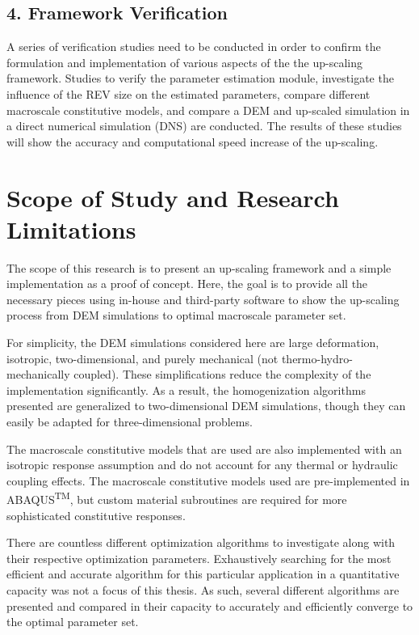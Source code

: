 \subsection*{4. Framework Verification}

A series of verification studies need to be conducted in order to confirm the formulation and implementation of various aspects of the the up-scaling framework. Studies to verify the parameter estimation module, investigate the influence of the REV size on the estimated parameters, compare different macroscale constitutive models, and compare a DEM and up-scaled simulation in a direct numerical simulation (DNS) are conducted. The results of these studies will show the accuracy and computational speed increase of the up-scaling.

\section{Scope of Study and Research Limitations}

The scope of this research is to present an up-scaling framework and a simple implementation as a proof of concept. Here, the goal is to provide all the necessary pieces using in-house and third-party software to show the up-scaling process from DEM simulations to optimal macroscale parameter set. 

For simplicity, the DEM simulations considered here are large deformation, isotropic, two-dimensional, and purely mechanical (not thermo-hydro-mechanically coupled). These simplifications reduce the complexity of the implementation significantly. As a result, the homogenization algorithms presented are generalized to two-dimensional DEM simulations, though they can easily be adapted for three-dimensional problems.

The macroscale constitutive models that are used are also implemented with an isotropic response assumption and do not account for any thermal or hydraulic coupling effects. The macroscale constitutive models used are pre-implemented in ABAQUS\textsuperscript{TM}, but custom material subroutines are required for more sophisticated constitutive responses. 

There are countless different optimization algorithms to investigate along with their respective optimization parameters. Exhaustively searching for the most efficient and accurate algorithm for this particular application in a quantitative capacity was not a focus of this thesis. As such, several different algorithms are presented and compared in their capacity to accurately and efficiently converge to the optimal parameter set.

